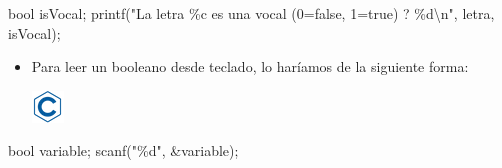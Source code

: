 \documentclass[
]{book}
\newenvironment{Shaded}{\begin{snugshade}}{\end{snugshade}}
\newcommand{\DataTypeTok}[1]{\textcolor[rgb]{0.13,0.29,0.53}{#1}}
\newcommand{\NormalTok}[1]{#1}
\newcommand{\SpecialCharTok}[1]{\textcolor[rgb]{0.00,0.00,0.00}{#1}}
\newcommand{\StringTok}[1]{\textcolor[rgb]{0.31,0.60,0.02}{#1}}
\providecommand{\tightlist}{%
  \setlength{\itemsep}{0pt}\setlength{\parskip}{0pt}}
\begin{document}
\begin{Shaded}
\begin{Highlighting}[]
\DataTypeTok{bool}\NormalTok{ isVocal;}
\NormalTok{printf(}\StringTok{"La letra \%c es una vocal (0=false, 1=true) ? \%d}\SpecialCharTok{\textbackslash{}n}\StringTok{"}\NormalTok{, letra, isVocal);}
\end{Highlighting}
\end{Shaded}

\begin{itemize}
\tightlist
\item
  Para leer un booleano desde teclado, lo haríamos de la siguiente forma:

  \includegraphics{./img/c.png}
\end{itemize}

\begin{Shaded}
\begin{Highlighting}[]
\DataTypeTok{bool}\NormalTok{ variable;}
\NormalTok{scanf(}\StringTok{"\%d"}\NormalTok{, \&variable);}
\end{Highlighting}
\end{Shaded}
\end{document}
